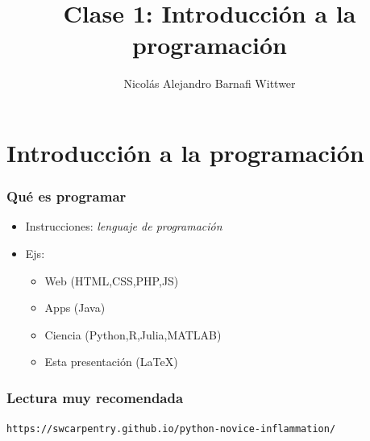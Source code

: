 \documentclass[14pt,aspectratio=169,xcolor=dvipsnames]{beamer}
\title[short title]{Clase 1: Introducción a la programación}
\subtitle{}
\author[NA Barnafi] {Nicolás Alejandro Barnafi Wittwer}
\institute[UC|CMM] 
{
    Pontificia Universidad Católica de Chile \\
    Centro de Modelamiento Matemático
}
\begin{document}
\begin{frame}
    \maketitle
\end{frame}
\section{Introducción a la programación}
\begin{frame}[t]\frametitle{Qué es programar}

\begin{itemize}
    \item Instrucciones: \emph{lenguaje de programación}
    \item Ejs: 
        \begin{itemize}
            \item Web (HTML,CSS,PHP,JS)
            \item Apps (Java)
            \item {Ciencia (Python,R,Julia,MATLAB)}
            \item Esta presentación (\LaTeX)
        \end{itemize}
\end{itemize}

\vspace{1cm}
\pause {}
\end{frame}
\begin{frame}\frametitle{Lectura muy recomendada}
\texttt{https://swcarpentry.github.io/python-novice-inflammation/}
\end{frame}
\end{document}
